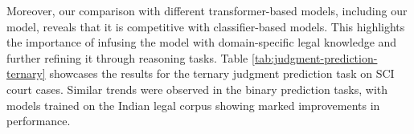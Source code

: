 Moreover, our comparison with different transformer-based models, including our \texttt{\namel} model, reveals that it is competitive with classifier-based models. This highlights the importance of infusing the model with domain-specific legal knowledge and further refining it through reasoning tasks. 
Table \ref{tab:judgment-prediction-ternary} showcases the results for the ternary judgment prediction task on SCI court cases. Similar trends were observed in the binary prediction tasks, with models trained on the Indian legal corpus showing marked improvements in performance.


